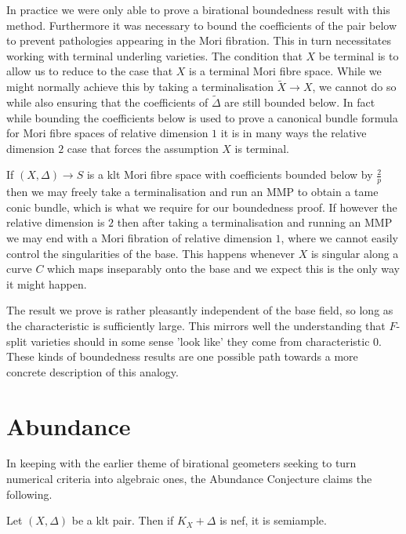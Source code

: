 \documentclass[a4paper,12pt]{book}
\newcommand{\D}{\Delta}
\begin{document}
	
	In practice we were only able to prove a birational boundedness result with this method. Furthermore it was necessary to bound the coefficients of the pair below to prevent pathologies appearing in the Mori fibration. This in turn necessitates working with terminal underling varieties. The condition that $X$ be terminal is to allow us to reduce to the case that $X$ is a terminal Mori fibre space. While we might normally achieve this by taking a terminalisation $\tilde{X} \to X$, we cannot do so while also ensuring that the coefficients of $\tilde{\D}$ are still bounded below. In fact while bounding the coefficients below is used to prove a canonical bundle formula for Mori fibre spaces of relative dimension $1$ it is in many ways the relative dimension $2$ case that forces the assumption $X$ is terminal.
	
	If $(X,\Delta) \to S$ is a klt Mori fibre space with coefficients bounded below by $\frac{2}{p}$ then we may freely take a terminalisation and run an MMP to obtain a tame conic bundle, which is what we require for our boundedness proof. If however the relative dimension is $2$ then after taking a terminalisation and running an MMP we may end with a Mori fibration of relative dimension $1$, where we cannot easily control the singularities of the base. This happens whenever $X$ is singular along a curve $C$ which maps inseparably onto the base and we expect this is the only way it might happen. 
	
	
	The result we prove is rather pleasantly independent of the base field, so long as the characteristic is sufficiently large. This mirrors well the understanding that $F$-split varieties should in some sense 'look like' they come from characteristic $0$. These kinds of boundedness results are one possible path towards a more concrete description of this analogy.
	
	

	\section{Abundance}
	
	In keeping with the earlier theme of birational geometers seeking to turn numerical criteria into algebraic ones, the Abundance Conjecture claims the following.
	
	\begin{conjecture*}
		
		Let $(X,\Delta)$ be a klt pair. Then if $K_{X}+\Delta$ is nef, it is semiample.	
		\end{conjecture*}
	
\end{document}

